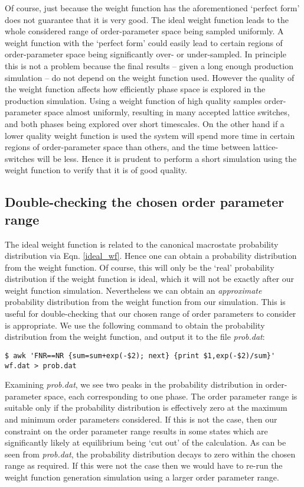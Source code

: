 \documentclass{report}
\begin{document}
Of course, just because the weight function has the aforementioned `perfect form' does not guarantee that it is very good. The ideal weight function
leads to the whole considered range of order-parameter space being sampled uniformly. A weight function with the `perfect form' could easily lead to
certain regions of order-parameter space being significantly over- or under-sampled. In principle this is not a problem because the final results -- given
a long enough production simulation -- do not depend on the weight function used. However the quality of the weight function affects how efficiently 
phase space is explored in the production simulation. Using a weight function of high quality samples order-parameter space almost uniformly, resulting
in many accepted lattice switches, and both phases being explored over short timescales. On the other hand if a lower quality weight function is used the
system will spend more time in certain regions of order-parameter space than others, and the time between lattice-switches will be less. Hence it is prudent
to perform a short simulation using the weight function to verify that it is of good quality.

\subsection{Double-checking the chosen order parameter range}\label{section:double_check}
The ideal weight function is related to the canonical macrostate probability distribution via Eqn. \eqref{ideal_wf}. Hence one can obtain a probability
distribution from the weight function. Of course, this will only be the `real' probability distribution if the weight function is ideal, which it
will not be exactly after our weight function simulation. Nevertheless we can obtain an \emph{approximate} probability distribution from the weight
function from our simulation. This is useful for double-checking that our chosen range of order parameters to consider is appropriate. We use the
following command to obtain the probability distribution from the weight function, and output it to the file \emph{prob.dat}:
\begin{verbatim}
$ awk 'FNR==NR {sum=sum+exp(-$2); next} {print $1,exp(-$2)/sum}'
wf.dat > prob.dat
\end{verbatim}
Examining \emph{prob.dat}, we see two peaks in the probability distribution in order-parameter space, each corresponding to one phase. The order parameter
range is suitable only if the probability distribution is effectively zero at the maximum and minimum order parameters considered. If this is not the
case, then our constraint on the order parameter range results in some states which are significantly likely at equilibrium being `cut out' of the
calculation. As can be seen from \emph{prob.dat}, the probability distribution decays to zero within the chosen range as required. If this were not the
case then we would have to re-run the weight function generation simulation using a larger order parameter range.
\end{document}
